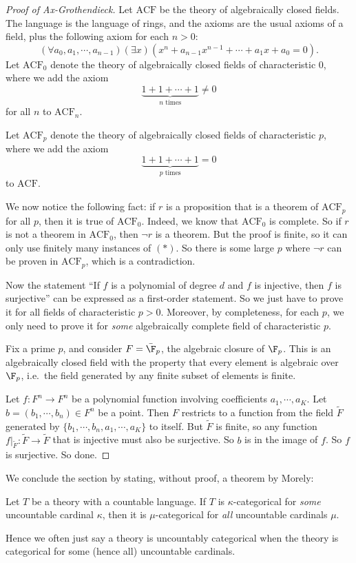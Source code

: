 \documentclass[a4paper]{article}
\begin{document}
\begin{own}
\begin{proof}[Proof of Ax-Grothendieck]
    Let $\mathrm{ACF}$ be the theory of algebraically closed fields. The language is the language of rings, and the axioms are the usual axioms of a field, plus the following axiom for each $n > 0$:
    \[
      (\forall a_0, a_1, \cdots, a_{n - 1})(\exists x)(x^n + a_{n - 1}x^{n - 1} + \cdots + a_1 x + a_0 = 0).
    \]
    Let $\mathrm{ACF}_0$ denote the theory of algebraically closed fields of characteristic $0$, where we add the axiom
    \[
      \underbrace{1 + 1 + \cdots + 1}_{n\text{ times}} \not= 0\tag{$*$}
    \]
    for all $n$ to $\mathrm{ACF}_n$.

    Let $\mathrm{ACF}_p$ denote the theory of algebraically closed fields of characteristic $p$, where we add the axiom
    \[
      \underbrace{1 + 1 + \cdots + 1}_{p\text{ times}} = 0
    \]
    to $\mathrm{ACF}$.

    We now notice the following fact: if $r$ is a proposition that is a theorem of $\mathrm{ACF}_p$ for all $p$, then it is true of $\mathrm{ACF}_0$. Indeed, we know that $\mathrm{ACF}_0$ is complete. So if $r$ is not a theorem in $\mathrm{ACF}_0$, then $\neg r$ is a theorem. But the proof is finite, so it can only use finitely many instances of $(*)$. So there is some large $p$ where $\neg r$ can be proven in $\mathrm{ACF}_p$, which is a contradiction.

    Now the statement ``If $f$ is a polynomial of degree $d$ and $f$ is injective, then $f$ is surjective'' can be expressed as a first-order statement. So we just have to prove it for all fields of characteristic $p > 0$. Moreover, by completeness, for each $p$, we only need to prove it for \emph{some} algebraically complete field of characteristic $p$.

    Fix a prime $p$, and consider $F = \bar{\F}_p$, the algebraic closure of $\F_p$. This is an algebraically closed field with the property that every element is algebraic over $\F_p$, i.e.\ the field generated by any finite subset of elements is finite.

    Let $f: F^n \to F^n$ be a polynomial function involving coefficients $a_1, \cdots, a_K$. Let $b = (b_1, \cdots, b_n) \in F^n$ be a point. Then $F$ restricts to a function from the field $\tilde{F}$ generated by $\{b_1, \cdots, b_n, a_1, \cdots, a_K\}$ to itself. But $\tilde{F}$ is finite, so any function $f|_{\tilde{F}}: \tilde{F} \to \tilde{F}$ that is injective must also be surjective. So $b$ is in the image of $f$. So $f$ is surjective. So done.
  \end{proof}

  We conclude the section by stating, without proof, a theorem by Morely:
  \begin{thm}
    Let $T$ be a theory with a countable language. If $T$ is $\kappa$-categorical for \emph{some} uncountable cardinal $\kappa$, then it is $\mu$-categorical for \emph{all} uncountable cardinals $\mu$.
  \end{thm}
  Hence we often just say a theory is uncountably categorical when the theory is categorical for some (hence all) uncountable cardinals.
\end{own}
\end{document}
